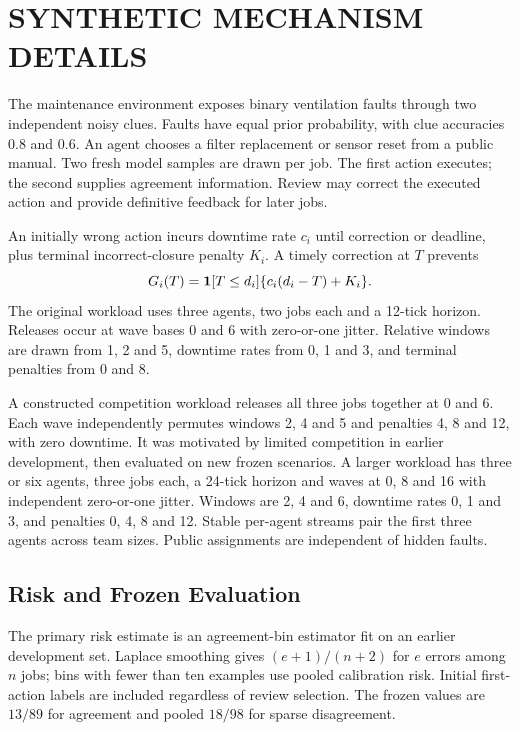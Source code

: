 \section{SYNTHETIC MECHANISM DETAILS}
\noindent The maintenance environment exposes binary ventilation faults through two independent noisy clues. Faults have equal prior probability, with clue accuracies 0.8 and 0.6. An agent chooses a filter replacement or sensor reset from a public manual. Two fresh model samples are drawn per job. The first action executes; the second supplies agreement information. Review may correct the executed action and provide definitive feedback for later jobs.\draftcredit

An initially wrong action incurs downtime rate $c_i$ until correction or deadline, plus terminal incorrect-closure penalty $K_i$. A timely correction at $T$ prevents
\begin{equation}
 G_i(T)=\mathbf{1}[T\leq d_i]\{c_i(d_i-T)+K_i\}.
 \label{eq:maintenance}
\end{equation}
The original workload uses three agents, two jobs each and a 12-tick horizon. Releases occur at wave bases 0 and 6 with zero-or-one jitter. Relative windows are drawn from 1, 2 and 5, downtime rates from 0, 1 and 3, and terminal penalties from 0 and 8.

A constructed competition workload releases all three jobs together at 0 and 6. Each wave independently permutes windows 2, 4 and 5 and penalties 4, 8 and 12, with zero downtime. It was motivated by limited competition in earlier development, then evaluated on new frozen scenarios. A larger workload has three or six agents, three jobs each, a 24-tick horizon and waves at 0, 8 and 16 with independent zero-or-one jitter. Windows are 2, 4 and 6, downtime rates 0, 1 and 3, and penalties 0, 4, 8 and 12. Stable per-agent streams pair the first three agents across team sizes. Public assignments are independent of hidden faults.

\subsection{Risk and Frozen Evaluation}
The primary risk estimate is an agreement-bin estimator fit on an earlier development set. Laplace smoothing gives $(e+1)/(n+2)$ for $e$ errors among $n$ jobs; bins with fewer than ten examples use pooled calibration risk. Initial first-action labels are included regardless of review selection. The frozen values are $13/89$ for agreement and pooled $18/98$ for sparse disagreement.

